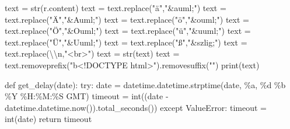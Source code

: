 \documentclass[
  a4paper,
]{book}
\newenvironment{Shaded}{\begin{snugshade}}{\end{snugshade}}
\newcommand{\BuiltInTok}[1]{\textcolor[rgb]{0.00,0.23,0.31}{#1}}
\newcommand{\CharTok}[1]{\textcolor[rgb]{0.13,0.47,0.30}{#1}}
\newcommand{\ControlFlowTok}[1]{\textcolor[rgb]{0.00,0.23,0.31}{#1}}
\newcommand{\KeywordTok}[1]{\textcolor[rgb]{0.00,0.23,0.31}{#1}}
\newcommand{\NormalTok}[1]{\textcolor[rgb]{0.00,0.23,0.31}{#1}}
\newcommand{\OperatorTok}[1]{\textcolor[rgb]{0.37,0.37,0.37}{#1}}
\newcommand{\PreprocessorTok}[1]{\textcolor[rgb]{0.68,0.00,0.00}{#1}}
\newcommand{\SpecialCharTok}[1]{\textcolor[rgb]{0.37,0.37,0.37}{#1}}
\newcommand{\StringTok}[1]{\textcolor[rgb]{0.13,0.47,0.30}{#1}}
\begin{document}
\begin{Shaded}
\begin{Highlighting}[]
\NormalTok{        text }\OperatorTok{=} \BuiltInTok{str}\NormalTok{(r.content)}
\NormalTok{        text }\OperatorTok{=}\NormalTok{ text.replace(}\StringTok{"ä"}\NormalTok{,}\StringTok{"\&auml;"}\NormalTok{)}
\NormalTok{        text }\OperatorTok{=}\NormalTok{ text.replace(}\StringTok{"Ä"}\NormalTok{,}\StringTok{"\&Auml;"}\NormalTok{)}
\NormalTok{        text }\OperatorTok{=}\NormalTok{ text.replace(}\StringTok{"ö"}\NormalTok{,}\StringTok{"\&ouml;"}\NormalTok{)}
\NormalTok{        text }\OperatorTok{=}\NormalTok{ text.replace(}\StringTok{"Ö"}\NormalTok{,}\StringTok{"\&Ouml;"}\NormalTok{)}
\NormalTok{        text }\OperatorTok{=}\NormalTok{ text.replace(}\StringTok{"ü"}\NormalTok{,}\StringTok{"\&uuml;"}\NormalTok{)}
\NormalTok{        text }\OperatorTok{=}\NormalTok{ text.replace(}\StringTok{"Ü"}\NormalTok{,}\StringTok{"\&Uuml;"}\NormalTok{)}
\NormalTok{        text }\OperatorTok{=}\NormalTok{ text.replace(}\StringTok{"ß"}\NormalTok{,}\StringTok{"\&szlig;"}\NormalTok{)}
\NormalTok{        text }\OperatorTok{=}\NormalTok{ text.replace(}\StringTok{\textquotesingle{}}\CharTok{\textbackslash{}\textbackslash{}}\StringTok{n\textquotesingle{}}\NormalTok{,}\StringTok{"\textless{}br\textgreater{}"}\NormalTok{)}
\NormalTok{        text }\OperatorTok{=} \BuiltInTok{str}\NormalTok{(text)}
\NormalTok{        text }\OperatorTok{=}\NormalTok{ text.removeprefix(}\StringTok{"b\textquotesingle{}\textless{}!DOCTYPE html\textgreater{}"}\NormalTok{).removesuffix(}\StringTok{"\textquotesingle{}"}\NormalTok{)}
        \BuiltInTok{print}\NormalTok{(text)}

\KeywordTok{def}\NormalTok{ get\_delay(date):}
    \ControlFlowTok{try}\NormalTok{:}
\NormalTok{        date }\OperatorTok{=}\NormalTok{ datetime.datetime.strptime(date, }\StringTok{\textquotesingle{}\%a, }\SpecialCharTok{\%d}\StringTok{ \%b \%Y \%H:\%M:\%S GMT\textquotesingle{}}\NormalTok{)}
\NormalTok{        timeout }\OperatorTok{=} \BuiltInTok{int}\NormalTok{((date }\OperatorTok{{-}}\NormalTok{ datetime.datetime.now()).total\_seconds())}
    \ControlFlowTok{except} \PreprocessorTok{ValueError}\NormalTok{:}
\NormalTok{        timeout }\OperatorTok{=} \BuiltInTok{int}\NormalTok{(date)}
    \ControlFlowTok{return}\NormalTok{ timeout}


\end{Highlighting}
\end{Shaded}
\end{document}
